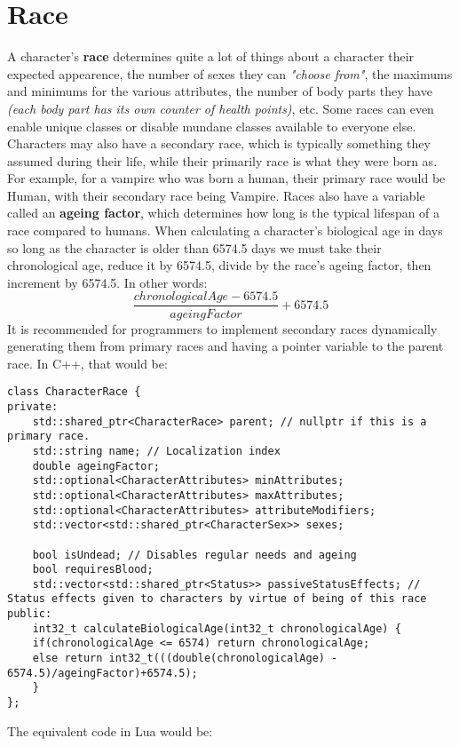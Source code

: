 \documentclass[openany,11pt,a4paper]{book}
\begin{document}
\section{Race}
A character's \textbf{race} determines quite a lot of things about a character \textemdash their expected appearence, the number of sexes they can \textit{"choose from"}, the maximums and minimums for the various attributes, the number of body parts they have \textit{(each body part has its own counter of health points)}, etc. Some races can even enable unique classes or disable mundane classes available to everyone else.\newline
Characters may also have a secondary race, which is typically something they assumed during their life, while their primarily race is what they were born as. For example, for a vampire who was born a human, their primary race would be Human, with their secondary race being Vampire.\newline
Races also have a variable called an \textbf{ageing factor}, which determines how long is the typical lifespan of a race compared to humans. When calculating a character's biological age in days \textemdash so long as the character is older than 6574.5 days \textemdash we must take their chronological age, reduce it by 6574.5, divide by the race's ageing factor, then increment by 6574.5. In other words: \[\frac{chronologicalAge-6574.5}{ageingFactor}+6574.5\]
It is recommended for programmers to implement secondary races dynamically generating them from primary races and having a pointer variable to the parent race. In C++, that would be:
\begin{lstlisting}[style=CPPStyle]
class CharacterRace {
private:
	std::shared_ptr<CharacterRace> parent; // nullptr if this is a primary race.
	std::string name; // Localization index
	double ageingFactor;
	std::optional<CharacterAttributes> minAttributes;
	std::optional<CharacterAttributes> maxAttributes;
	std::optional<CharacterAttributes> attributeModifiers;
	std::vector<std::shared_ptr<CharacterSex>> sexes;
	
	bool isUndead; // Disables regular needs and ageing
	bool requiresBlood;
	std::vector<std::shared_ptr<Status>> passiveStatusEffects; // Status effects given to characters by virtue of being of this race
public:
	int32_t calculateBiologicalAge(int32_t chronologicalAge) {
	if(chronologicalAge <= 6574) return chronologicalAge;
	else return int32_t(((double(chronologicalAge) - 6574.5)/ageingFactor)+6574.5);
	}
};
\end{lstlisting}
The equivalent code in Lua would be:
\end{document}
